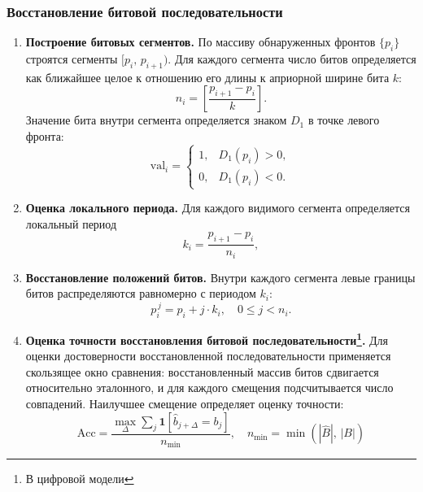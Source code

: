 \subsubsection{Восстановление битовой последовательности}

\begin{enumerate}
    \item \textbf{Построение битовых сегментов.} По массиву обнаруженных фронтов $\{p_i\}$ строятся сегменты $[p_i,\,p_{i+1})$. Для каждого сегмента число битов определяется как ближайшее целое к отношению его длины к априорной ширине бита $k$:
    \begin{equation}
        n_i = \left[\frac{p_{i+1}-p_i}{k}\right].
    \end{equation}
    Значение бита внутри сегмента определяется знаком $D_1$ в точке левого фронта:
    \begin{equation}
        \mathrm{val}_i = \begin{cases}
            1, & D_1(p_i) > 0,\\
            0, & D_1(p_i) < 0.
        \end{cases}
    \end{equation}

    \item \textbf{Оценка локального периода.} Для каждого видимого сегмента определяется локальный период
    \begin{equation}
        k_i = \frac{p_{i+1}-p_i}{n_i},
    \end{equation}

    \item \textbf{Восстановление положений битов.} Внутри каждого сегмента левые границы битов распределяются равномерно с периодом $k_i$:
    \begin{equation}
        p_i^{\,j} = p_i + j\cdot k_i,
        \quad 0 \leq j < n_i.
    \end{equation}

    \item \textbf{Оценка точности восстановления битовой последовательности\footnote{\label{ftnt:model}В цифровой модели}.} Для оценки достоверности восстановленной последовательности применяется скользящее окно сравнения: восстановленный массив битов сдвигается относительно эталонного, и для каждого смещения подсчитывается число совпадений. Наилучшее смещение определяет оценку точности:
    \begin{equation}
        \mathrm{Acc} = \frac{\max_{\Delta}\sum_j \mathbf{1}[\hat b_{j+\Delta} = b_j]}{n_{\min}}, \quad n_{\min} = \min(|\hat B|,\,|B|)
    \end{equation}


\end{enumerate}
